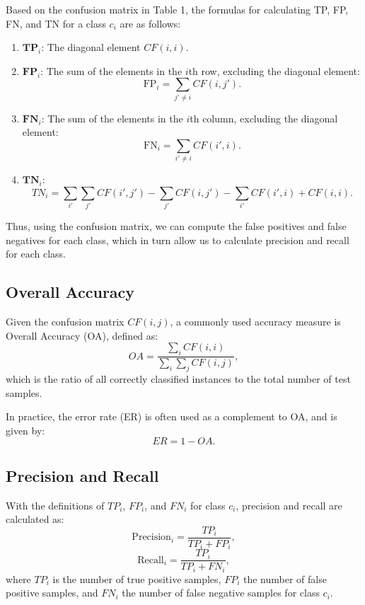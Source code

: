 \documentclass[12pt]{article}
\begin{document}
Based on the confusion matrix in Table 1, the formulas for calculating TP, FP, FN, and TN for a class \(c_i\) are as follows:
\begin{enumerate}
    \item \(\textbf{TP}_i\): The diagonal element \(CF(i,i)\).
    \item \(\textbf{FP}_i\): The sum of the elements in the \(i\)th row, excluding the diagonal element:
    \[
    \text{FP}_i = \sum_{j' \neq i} CF(i,j').
    \]
    \item \(\textbf{FN}_i\): The sum of the elements in the \(i\)th column, excluding the diagonal element:
    \[
    \text{FN}_i = \sum_{i' \neq i} CF(i',i).
    \]
    \item \(\textbf{TN}_i\):
    \[
    TN_i = \sum_{i'}\sum_{j'} CF(i',j') - \sum_{j'} CF(i,j') - \sum_{i'} CF(i',i) + CF(i,i).
    \]
\end{enumerate}

Thus, using the confusion matrix, we can compute the false positives and false negatives for each class, which in turn allow us to calculate precision and recall for each class.

\subsection{Overall Accuracy}
Given the confusion matrix \(CF(i,j)\), a commonly used accuracy measure is Overall Accuracy (OA), defined as:
\[
OA = \frac{\sum_i CF(i,i)}{\sum_i\sum_j CF(i,j)},
\]
which is the ratio of all correctly classified instances to the total number of test samples.

In practice, the error rate (ER) is often used as a complement to OA, and is given by:
\[
ER = 1 - OA.
\]

\subsection{Precision and Recall}
With the definitions of \(TP_i\), \(FP_i\), and \(FN_i\) for class \(c_i\), precision and recall are calculated as:
\begin{equation}
\text{Precision}_i = \frac{TP_i}{TP_i + FP_i},
\end{equation}
\begin{equation}
\text{Recall}_i = \frac{TP_i}{TP_i + FN_i},
\end{equation}
where \(TP_i\) is the number of true positive samples, \(FP_i\) the number of false positive samples, and \(FN_i\) the number of false negative samples for class \(c_i\).
\end{document}
